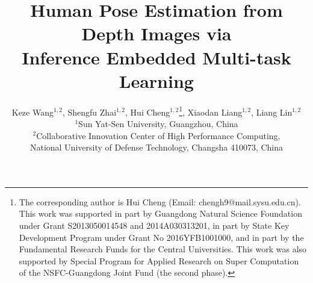 \documentclass{sig-alternate-05-2015}
\begin{document}




\title{Human Pose Estimation from Depth Images via \\
Inference Embedded Multi-task Learning}


\author{
\alignauthor
Keze Wang$^{1, 2}$, Shengfu Zhai$^{1, 2}$, Hui Cheng$^{1, 2}$\thanks{The corresponding author is Hui Cheng (Email: chengh9@mail.sysu.edu.cn). This work was supported in part by Guangdong Natural Science Foundation under Grant S2013050014548 and 2014A030313201, in part by State Key Development Program under Grant No 2016YFB1001000, and in part by the Fundamental Research Funds for the Central Universities. This work was also supported by Special Program for Applied Research on Super Computation of the NSFC-Guangdong Joint Fund (the second phase).}, Xiaodan Liang$^{1, 2}$, Liang Lin$^{1, 2}$ \\
\affaddr $^1$Sun Yat-Sen University, Guangzhou, China \\
$^2$Collaborative Innovation Center of High Performance Computing, \\
National University of Defense Technology, Changsha 410073, China
}

\end{document}
